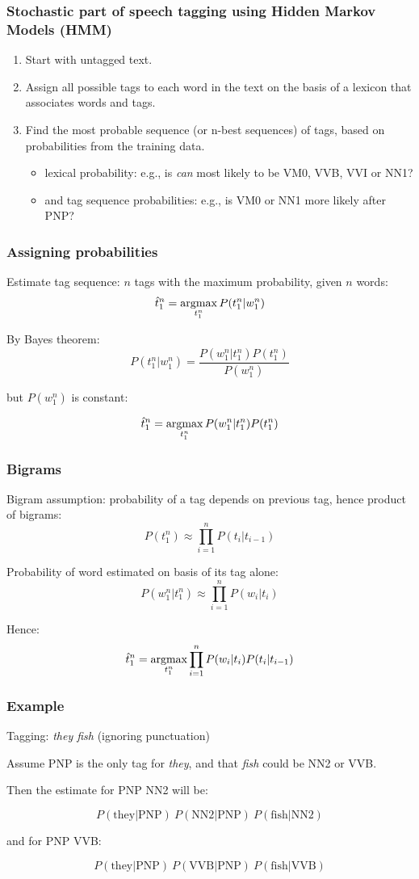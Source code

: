 \documentclass{beamer}
\newcommand{\argmax}{\operatornamewithlimits{argmax}}
\begin{document}
\begin{frame}
\frametitle{Stochastic part of speech tagging using Hidden Markov Models (HMM)}
\begin{enumerate}
\item Start with untagged text.
\item Assign all possible tags to each word in the text on the basis
of a lexicon that associates words and tags.
\item Find the most probable sequence (or n-best sequences) of tags, based on
probabilities from the training data.
\begin{itemize}
\item lexical probability: e.g., is {\it can}
most likely to be VM0, VVB, VVI or NN1? 
\item and tag sequence probabilities: e.g., 
is VM0 or NN1 more likely after PNP?
\end{itemize}
\end{enumerate}
\end{frame}



\begin{frame}
\frametitle{Assigning probabilities}

Estimate tag sequence: $n$ tags with the maximum probability, given
$n$ words:
\[
\hat{t}^n_1 = \argmax_{t^n_1} P(t^n_1 | w^n_1)
\]


By Bayes theorem:
\[
P(t^n_1 | w^n_1) = \frac{  P(w^n_1 | t^n_1) P(t^n_1)}{P(w^n_1)}
\]

but $P(w^n_1)$ is constant:

\[
\hat{t}^n_1 = \argmax_{t^n_1} P(w^n_1 | t^n_1) P(t^n_1) 
\]


\end{frame} 

\begin{frame}
\frametitle{Bigrams}

Bigram assumption: probability of a tag depends on previous 
tag, hence product of bigrams:
\[ P(t^n_1) \approx \prod^n_{i=1} P(t_i | t_{i-1}) \]

Probability of word estimated on basis of its tag alone:
\[ P(w^n_1 | t^n_1) \approx \prod^n_{i=1} P(w_i | t_i) \]

Hence:
\[
\hat{t}^n_1 =  \argmax_{t^n_1} \prod^n_{i=1} P(w_i | t_i) P(t_i | t_{i-1}) 
\]

\end{frame} 

\begin{frame}
\frametitle{Example}

Tagging: {\it they fish} (ignoring punctuation)

Assume PNP is the only tag for {\it they},
and that {\it fish} could be NN2 or VVB.

Then the estimate for PNP NN2 will be:

\[
P(\mbox{they} | \mbox{PNP})\ P(\mbox{NN2}|\mbox{PNP})\ P(\mbox{fish}|\mbox{NN2})
\]

and for PNP VVB:

\[
P(\mbox{they} | \mbox{PNP}) \ P(\mbox{VVB}|\mbox{PNP}) \ P(\mbox{fish}|\mbox{VVB})
\]


\end{frame}
\end{document}
